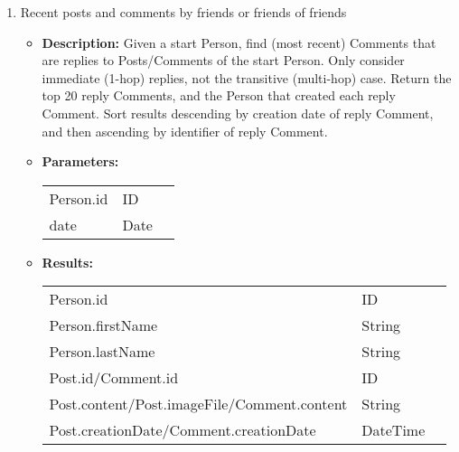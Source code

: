 {\begin{enumerate}
	\item Recent posts and comments by friends or friends of friends
	\begin{itemize}
		\item \textbf{Description:}
            Given a start Person, find (most recent) Comments that are replies
            to Posts/Comments of the start Person. Only consider immediate
            (1-hop) replies, not the transitive (multi-hop) case.  Return the
            top 20 reply Comments, and the Person that created each reply
            Comment. Sort results descending by creation date of reply
            Comment, and then ascending by identifier of reply Comment.
		\item \textbf{Parameters:} \\
			\begin{tabular}{lll}
				Person.id 	 						& ID & \parbox[t]{20cm}{\par \strut} \\
				date 		 						& Date & \parbox[t]{20cm}{\par \strut} \\
			\end{tabular}		
		\item \textbf{Results:} \\
			\begin{tabular}{lll}
				Person.id 	 								& ID & \parbox[t]{20cm}{\par \strut} \\
				Person.firstName 	 						& String & \parbox[t]{20cm}{\par \strut} \\
				Person.lastName 	 						& String & \parbox[t]{20cm}{\par \strut} \\
				Post.id/Comment.id 	 						& ID & \parbox[t]{20cm}{\par \strut} \\
				Post.content/Post.imageFile/Comment.content	& String & \parbox[t]{20cm}{\par \strut} \\
				Post.creationDate/Comment.creationDate 	 	& DateTime & \parbox[t]{20cm}{\par \strut} \\
			\end{tabular}		
	\end{itemize}


\end{enumerate}}
